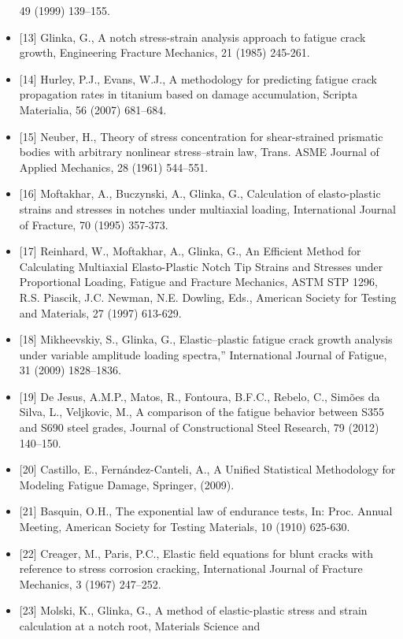 \documentclass[11pt]{article}
\begin{document}
\begin{itemize}
  49 (1999) 139--155.
\item
  {[}13{]} Glinka, G., A notch stress-strain analysis approach to
  fatigue crack growth, Engineering Fracture Mechanics, 21 (1985)
  245-261.
\item
  {[}14{]} Hurley, P.J., Evans, W.J., A methodology for predicting
  fatigue crack propagation rates in titanium based on damage
  accumulation, Scripta Materialia, 56 (2007) 681--684.
\item
  {[}15{]} Neuber, H., Theory of stress concentration for shear-strained
  prismatic bodies with arbitrary nonlinear stress--strain law, Trans.
  ASME Journal of Applied Mechanics, 28 (1961) 544--551.
\item
  {[}16{]} Moftakhar, A., Buczynski, A., Glinka, G., Calculation of
  elasto-plastic strains and stresses in notches under multiaxial
  loading, International Journal of Fracture, 70 (1995) 357-373.
\item
  {[}17{]} Reinhard, W., Moftakhar, A., Glinka, G., An Efficient Method
  for Calculating Multiaxial Elasto-Plastic Notch Tip Strains and
  Stresses under Proportional Loading, Fatigue and Fracture Mechanics,
  ASTM STP 1296, R.S. Piascik, J.C. Newman, N.E. Dowling, Eds., American
  Society for Testing and Materials, 27 (1997) 613-629.
\item
  {[}18{]} Mikheevskiy, S., Glinka, G., Elastic--plastic fatigue crack
  growth analysis under variable amplitude loading spectra,''
  International Journal of Fatigue, 31 (2009) 1828--1836.
\item
  {[}19{]} De Jesus, A.M.P., Matos, R., Fontoura, B.F.C., Rebelo, C.,
  Simões da Silva, L., Veljkovic, M., A comparison of the fatigue
  behavior between S355 and S690 steel grades, Journal of Constructional
  Steel Research, 79 (2012) 140--150.
\item
  {[}20{]} Castillo, E., Fernández-Canteli, A., A Unified Statistical
  Methodology for Modeling Fatigue Damage, Springer, (2009).
\item
  {[}21{]} Basquin, O.H., The exponential law of endurance tests, In:
  Proc. Annual Meeting, American Society for Testing Materials, 10
  (1910) 625-630.
\item
  {[}22{]} Creager, M., Paris, P.C., Elastic field equations for blunt
  cracks with reference to stress corrosion cracking, International
  Journal of Fracture Mechanics, 3 (1967) 247--252.
\item
  {[}23{]} Molski, K., Glinka, G., A method of elastic-plastic stress
  and strain calculation at a notch root, Materials Science and

\end{itemize}
\end{document}
